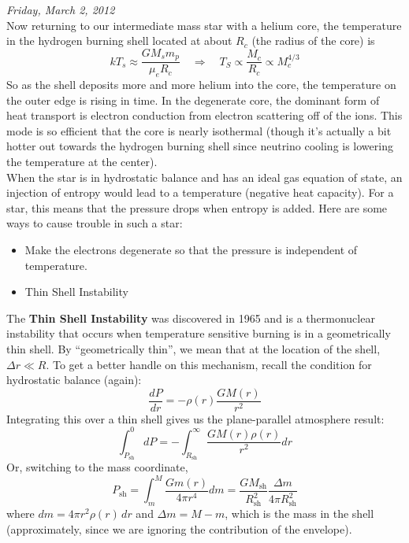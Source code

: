 \documentclass[10pt]{article}
\numberwithin{equation}{section}
\newcommand{\n}{\noindent}
\begin{document}
    \n \textit{Friday, March 2, 2012}\\

    \n Now returning to our intermediate mass star with a helium
    core, the temperature in the hydrogen burning shell located at
    about $R_c$ (the radius of the core) is
    \begin{equation}
      \label{eq:282}
      kT_s\approx\frac{G M_sm_p}{\mu_e R_c}\quad\Rightarrow \quad
      T_S\propto \frac{M_c}{R_c}\propto M_c^{4/3}
    \end{equation}
    So as the shell deposits more and more helium into the core, the
    temperature on the outer edge is rising in time. In the degenerate core,
    the dominant form of heat transport is electron conduction from
    electron scattering off of the ions. This mode is so efficient
    that the core is nearly isothermal (though it's actually a bit
    hotter out towards the hydrogen burning shell since neutrino
    cooling is lowering the temperature at the center).\\

    \n When the star is in hydrostatic balance and has an ideal gas
    equation of state, an injection of entropy would lead to a
    temperature (negative heat capacity). For a star, this means that
    the pressure drops when entropy is added. Here are some ways to
    cause trouble in such a star:
    \begin{itemize}
    \item Make the electrons degenerate so that the pressure is
      independent of temperature. 
    \item Thin Shell Instability
    \end{itemize}
    The \textbf{Thin Shell Instability} was discovered in 1965 and is
    a thermonuclear instability that occurs when temperature sensitive
    burning is in a geometrically thin shell. By ``geometrically
    thin'', we mean that at the location of the shell, $\Delta r\ll
    R$. To get a better handle on this mechanism, recall the condition
    for hydrostatic balance (again):
    \begin{equation}
      \label{eq:283}
      \frac{dP}{dr}=-\rho(r)\frac{GM(r)}{r^2}
    \end{equation}
    Integrating this over a thin shell gives us the plane-parallel
    atmosphere result:
    \begin{equation}
      \label{eq:284}
      \int_{P_{\mathrm{sh}}}^0dP=-\int_{R_{\mathrm{sh}}}^\infty
      \frac{GM(r) \rho(r)}{r^2}dr
    \end{equation}
    Or, switching to the mass coordinate,
    \begin{equation}
      \label{eq:285}
      P_{\mathrm{sh}}=\int_m^M\frac{Gm(r)}{4\pi r^4}dm=\frac{G
        M_{\mathrm{sh}}}{R_{\mathrm{sh}}^2}\frac{\Delta m}{4\pi R_{\mathrm{sh}}^2}
    \end{equation}
    where $dm=4\pi r^2 \rho(r)\,dr$ and $\Delta m= M-m$, which is
    the mass in the shell (approximately, since we are ignoring the
    contribution of the envelope).\\
\end{document}
